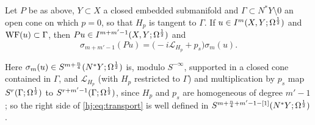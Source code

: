 \begin{theorem}\label{hj:thm:transport}
  Let $P$ be as above, $Y\subset X$ a closed embedded submanifold and
  $\Gamma\subset N^*Y\setminus0$ an open cone on which $p=0$, so that $H_p$ is
  tangent to $\Gamma$.  If $u\in I^{m}(X,Y;\Omega^{\frac12})$ and $\operatorname{WF}(u)\subset\Gamma$,
  then $Pu\in I^{m+m'-1}(X,Y;\Omega^{\frac12})$ and
  \begin{equation}\label{hj:eq:transport}
    \sigma_{m+m'-1}(Pu)=\big(-i\mathcal L_{H_p}+p_s\big)\sigma_m(u).
  \end{equation}
\end{theorem}
Here $\sigma_m(u)\in S^{m+\frac n4}(N^*Y;\Omega^{\frac12})$ is, modulo $S^{-\infty}$,
supported in a closed cone contained in $\Gamma$, and $\mathcal L_{H_p}$ (with
$H_p$ restricted to $\Gamma$) and multiplication by $p_s$ map
$S^r(\Gamma;\Omega^{\frac12})$ to $S^{r+m'-1}(\Gamma;\Omega^{\frac12})$, since $H_p$ and $p_s$
are homogeneous of degree $m'-1$; so the right side of \eqref{hj:eq:transport}
is well defined in $S^{m+\frac n4+m'-1-[1]}(N^*Y;\Omega^{\frac12})$.
